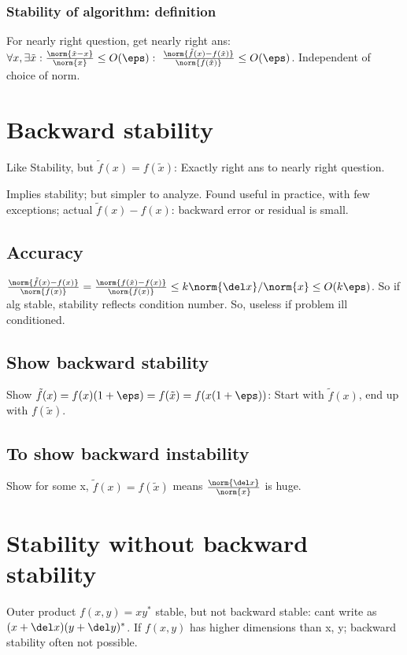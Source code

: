 \documentclass[oneside, article]{memoir}
\begin{document}
\subsubsection{Stability of algorithm: definition}
For nearly right question, get nearly right ans:\\
$\forall x, \exists \tilde{x}:\frac{\norm{\tilde{x} - x}}{\norm{x}} \leq O(\eps):\ \frac{\norm{\tilde{f}(x) - f(\tilde{x})}}{\norm{f(\tilde{x})}} \leq O(\eps)$. Independent of choice of norm.

\section{Backward stability}
Like Stability, but $\tilde{f}(x) = f(\tilde{x})$: Exactly right ans to nearly right question.

Implies stability; but simpler to analyze. Found useful in practice, with few exceptions; actual $\tilde{f}(x) - f(x)$: backward error or residual is small.

\subsection{Accuracy}
$\frac{\norm{\tilde{f}(x) - f(x)}}{\norm{f(x)}} = \frac{\norm{f(\tilde{x}) - f(x)}}{\norm{f(x)}} \leq k\norm{\del x}/\norm{x} \leq O(k \eps)$. So if alg stable, stability reflects condition number. So, useless if problem ill conditioned.

\subsection{Show backward stability}
Show $\tilde{f}(x) = f(x)(1 + \eps) = f(\tilde{x}) = f(x(1+\eps))$: Start with $\tilde{f}(x)$, end up with $f(\tilde{x})$.

\subsection{To show backward instability}
Show for some x, $\tilde{f}(x) = f(\tilde{x})$ means $\frac{\norm{\del x}}{\norm{x}}$ is huge.

\section{Stability without backward stability}
Outer product $f(x,y) = xy^{*}$ stable, but not backward stable: cant write as $(x+\del x) (y + \del y)^{*}$. If $f(x,y)$ has higher dimensions than x, y; backward stability often not possible. 
\end{document}
